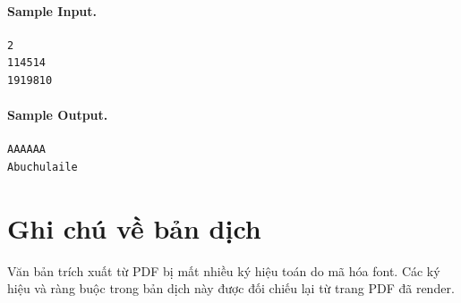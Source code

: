 \documentclass[11pt]{article}
\begin{document}
\paragraph{Sample Input.}
\begin{verbatim}
2
114514
1919810
\end{verbatim}

\paragraph{Sample Output.}
\begin{verbatim}
AAAAAA
Abuchulaile
\end{verbatim}

\section*{Ghi chú về bản dịch}

Văn bản trích xuất từ PDF bị mất nhiều ký hiệu toán do mã hóa font.  Các ký
hiệu và ràng buộc trong bản dịch này được đối chiếu lại từ trang PDF đã render.
\end{document}
